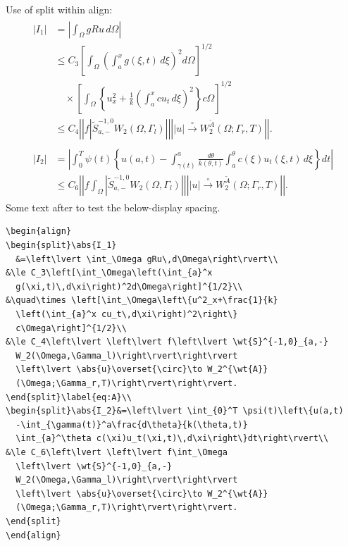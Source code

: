 \documentclass{article}
\newcommand{\ntt}{\normalfont\ttfamily}
\newcommand{\env}[1]{{\protect\ntt#1}}
\theoremstyle{definition}
\theoremstyle{remark}
\newcommand{\wt}{\widetilde}
\newcommand{\envert}[1]{\left\lvert#1\right\rvert}
\let\abs=\envert
\begin{document}
\newpage
Use of \env{split} within \env{align}:
{
\begin{align}
\begin{split}\abs{I_1}
  &=\left\lvert \int_\Omega gRu\,d\Omega\right\rvert\\
&\le C_3\left[\int_\Omega\left(\int_{a}^x
  g(\xi,t)\,d\xi\right)^2d\Omega\right]^{1/2}\\
&\quad\times \left[\int_\Omega\left\{u^2_x+\frac{1}{k}
  \left(\int_{a}^x cu_t\,d\xi\right)^2\right\}
  c\Omega\right]^{1/2}\\
&\le C_4\left\lvert \left\lvert f\left\lvert \wt{S}^{-1,0}_{a,-}
  W_2(\Omega,\Gamma_l)\right\rvert\right\rvert
  \left\lvert \abs{u}\overset{\circ}\to W_2^{\wt{A}}
  (\Omega;\Gamma_r,T)\right\rvert\right\rvert.
\end{split}\label{eq:A}\\
\begin{split}\abs{I_2}&=\left\lvert \int_{0}^T \psi(t)\left\{u(a,t)
  -\int_{\gamma(t)}^a\frac{d\theta}{k(\theta,t)}
  \int_{a}^\theta c(\xi)u_t(\xi,t)\,d\xi\right\}dt\right\rvert\\
&\le C_6\left\lvert \left\lvert f\int_\Omega
 \left\lvert \wt{S}^{-1,0}_{a,-}
  W_2(\Omega,\Gamma_l)\right\rvert\right\rvert
  \left\lvert \abs{u}\overset{\circ}\to W_2^{\wt{A}}
  (\Omega;\Gamma_r,T)\right\rvert\right\rvert.
\end{split}
\end{align}}%
Some text after to test the below-display spacing.

\begin{verbatim}
\begin{align}
\begin{split}\abs{I_1}
  &=\left\lvert \int_\Omega gRu\,d\Omega\right\rvert\\
&\le C_3\left[\int_\Omega\left(\int_{a}^x
  g(\xi,t)\,d\xi\right)^2d\Omega\right]^{1/2}\\
&\quad\times \left[\int_\Omega\left\{u^2_x+\frac{1}{k}
  \left(\int_{a}^x cu_t\,d\xi\right)^2\right\}
  c\Omega\right]^{1/2}\\
&\le C_4\left\lvert \left\lvert f\left\lvert \wt{S}^{-1,0}_{a,-}
  W_2(\Omega,\Gamma_l)\right\rvert\right\rvert
  \left\lvert \abs{u}\overset{\circ}\to W_2^{\wt{A}}
  (\Omega;\Gamma_r,T)\right\rvert\right\rvert.
\end{split}\label{eq:A}\\
\begin{split}\abs{I_2}&=\left\lvert \int_{0}^T \psi(t)\left\{u(a,t)
  -\int_{\gamma(t)}^a\frac{d\theta}{k(\theta,t)}
  \int_{a}^\theta c(\xi)u_t(\xi,t)\,d\xi\right\}dt\right\rvert\\
&\le C_6\left\lvert \left\lvert f\int_\Omega
  \left\lvert \wt{S}^{-1,0}_{a,-}
  W_2(\Omega,\Gamma_l)\right\rvert\right\rvert
  \left\lvert \abs{u}\overset{\circ}\to W_2^{\wt{A}}
  (\Omega;\Gamma_r,T)\right\rvert\right\rvert.
\end{split}
\end{align}
\end{verbatim}
\end{document}
